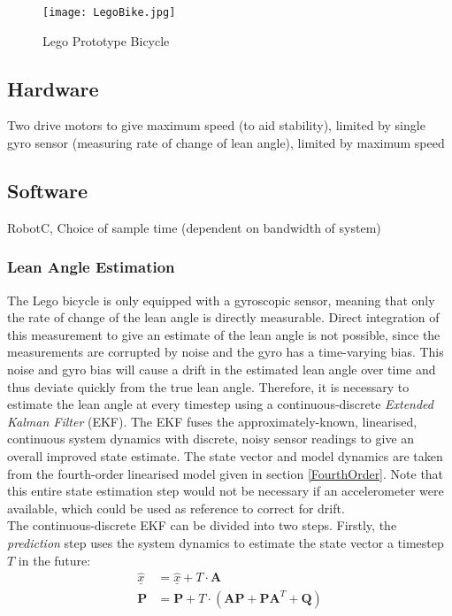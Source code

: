 \begin{figure}[H]
\centering
\texttt{[image: LegoBike.jpg]}
\caption{Lego Prototype Bicycle}
\end{figure}

\subsection{Hardware}
Two drive motors to give maximum speed (to aid stability), limited by single gyro sensor (measuring rate of change of lean angle), limited by maximum speed

\subsection{Software}
RobotC, Choice of sample time (dependent on bandwidth of system)

\subsubsection{Lean Angle Estimation}
The Lego bicycle is only equipped with a gyroscopic sensor, meaning that only the rate of change of the lean angle is directly measurable. Direct integration of this measurement to give an estimate of the lean angle is not possible, since the measurements are corrupted by noise and the gyro has a time-varying bias. This noise and gyro bias will cause a drift in the estimated lean angle over time and thus deviate quickly from the true lean angle. Therefore, it is necessary to estimate the lean angle at every timestep using a continuous-discrete \textit{Extended Kalman Filter} (EKF). The EKF fuses the approximately-known, linearised, continuous system dynamics with discrete, noisy sensor readings to give an overall improved state estimate. The state vector and model dynamics are taken from the fourth-order linearised model given in section \ref{FourthOrder}. Note that this entire state estimation step would not be necessary if an accelerometer were available, which could be used as reference to correct for drift. \\

The continuous-discrete EKF can be divided into two steps. Firstly, the \textit{prediction} step uses the system dynamics to estimate the state vector a timestep $T$ in the future:
\begin{align*}
\hat{\underline{x}} &= \hat{\underline{x}} + T \cdot \mathbf{A} \\
\mathbf{P} &= \mathbf{P} + T \cdot (\mathbf{A P} + \mathbf{P} \mathbf{A}^T + \mathbf{Q})
\end{align*}

